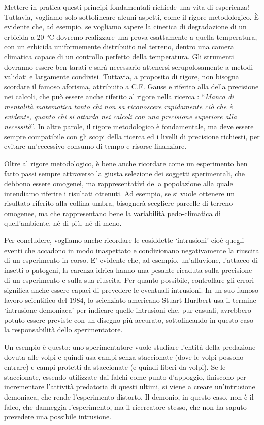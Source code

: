 \documentclass[
  12pt,
]{book}
\begin{document}
Mettere in pratica questi principi fondamentali richiede una vita di esperienza! Tuttavia, vogliamo solo sottolineare alcuni aspetti, come il rigore metodologico. È evidente che, ad esempio, se vogliamo sapere la cinetica di degradazione di un erbicida a 20 °C dovremo realizzare una prova esattamente a quella temperatura, con un erbicida uniformemente distribuito nel terreno, dentro una camera climatica capace di un controllo perfetto della temperatura. Gli strumenti dovranno essere ben tarati e sarà necessario attenersi scrupolosamente a metodi validati e largamente condivisi. Tuttavia, a proposito di rigore, non bisogna scordare il famoso aforisma, attribuito a C.F. Gauss e riferito alla della precisione nei calcoli, che può essere anche riferito al rigore nella ricerca : ``\emph{Manca di mentalità matematica tanto chi non sa riconoscere rapidamente ciò che è evidente, quanto chi si attarda nei calcoli con una precisione superiore alla necessità}''. In altre parole, il rigore metodologico è fondamentale, ma deve essere sempre compatibile con gli scopi della ricerca ed i livelli di precisione richiesti, per evitare un'eccessivo consumo di tempo e risorse finanziare.

Oltre al rigore metodologico, è bene anche ricordare come un esperimento ben fatto passi sempre attraverso la giusta selezione dei soggetti sperimentali, che debbono essere omogenei, ma rappresentativi della popolazione alla quale intendiamo riferire i risultati ottenuti. Ad esempio, se si vuole ottenere un risultato riferito alla collina umbra, bisognerà scegliere parcelle di terreno omogenee, ma che rappresentano bene la variabilità pedo-climatica di quell'ambiente, né di più, né di meno.

Per concludere, vogliamo anche ricordare le cosiddette `intrusioni' cioè quegli eventi che accadono in modo inaspettato e condizionano negativamente la riuscita di un esperimento in corso. E' evidente che, ad esempio, un'alluvione, l'attacco di insetti o patogeni, la carenza idrica hanno una pesante ricaduta sulla precisione di un esperimento e sulla sua riuscita. Per quanto possibile, controllare gli errori significa anche essere capaci di prevedere le eventuali intrusioni. In un suo famoso lavoro scientifico del 1984, lo scienziato americano Stuart Hurlbert usa il termine `intrusione demoniaca' per indicare quelle intrusioni che, pur casuali, avrebbero potuto essere previste con un disegno più accurato, sottolineando in questo caso la responsabilità dello sperimentatore.

Un esempio è questo: uno sperimentatore vuole studiare l'entità della predazione dovuta alle volpi e quindi usa campi senza staccionate (dove le volpi possono entrare) e campi protetti da staccionate (e quindi liberi da volpi). Se le staccionate, essendo utilizzate dai falchi come punto d'appoggio, finiscono per incrementare l'attività predatoria di questi ultimi, si viene a creare un'intrusione demoniaca, che rende l'esperimento distorto. Il demonio, in questo caso, non è il falco, che danneggia l'esperimento, ma il ricercatore stesso, che non ha saputo prevedere una possibile intrusione.
\end{document}

